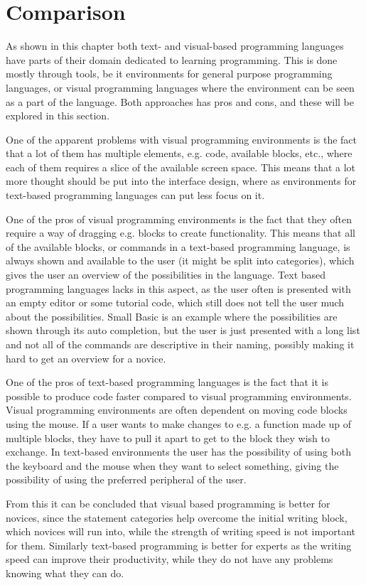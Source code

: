 \section{Comparison}
\label{sec:comparison_text_visual}
As shown in this chapter both text- and visual-based programming languages have parts of their domain dedicated to learning programming. This is done mostly through tools, be it environments for general purpose programming languages, or visual programming languages where the environment can be seen as a part of the language. Both approaches has pros and cons, and these will be explored in this section.

\begin{description}[style=nextline]
\item[Interface Layout] One of the apparent problems with visual programming environments is the fact that a lot of them has multiple elements, e.g. code, available blocks, etc., where each of them requires a slice of the available screen space. This means that a lot more thought should be put into the interface design, where as environments for text-based programming languages can put less focus on it.
\item[Statement Categories] One of the pros of visual programming environments is the fact that they often require a way of dragging e.g. blocks to create functionality. This means that all of the available blocks, or commands in a text-based programming language, is always shown and available to the user (it might be split into categories), which gives the user an overview of the possibilities in the language. Text based programming languages lacks in this aspect, as the user often is presented with an empty editor or some tutorial code, which still does not tell the user much about the possibilities. Small Basic is an example where the possibilities are shown through its auto completion, but the user is just presented with a long list and not all of the commands are descriptive in their naming, possibly making it hard to get an overview for a novice.
\item[Writing Speed] One of the pros of text-based programming languages is the fact that it is possible to produce code faster compared to visual programming environments. Visual programming environments are often dependent on moving code blocks using the mouse. If a user wants to make changes to e.g. a function made up of multiple blocks, they have to pull it apart to get to the block they wish to exchange. In text-based environments the user has the possibility of using both the keyboard and the mouse when they want to select something, giving the possibility of using the preferred peripheral of the user.
\end{description}

From this it can be concluded that visual based programming is better for novices, since the statement categories help overcome the initial writing block, which novices will run into, while the strength of writing speed is not important for them.
Similarly text-based programming is better for experts as the writing speed can improve their productivity, while they do not have any problems knowing what they can do.